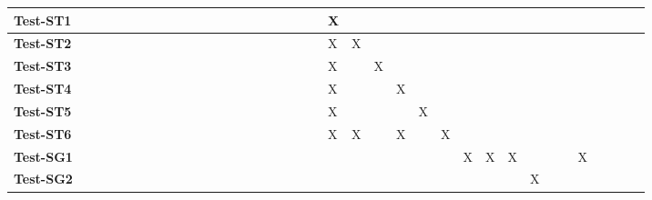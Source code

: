 \documentclass[12pt, titlepage]{article}
\begin{document}
\begin{landscape}
\begin{table}[H]
\begin{adjustwidth}{-0.1in}{-1in}
{\begin{tabular}{|c|c|c|c|c|c|c|c|c|c|c|c|c|c|c|c|c|l|l|l|l|l|l|l|l|l|l|l|l|l|l|l|l|l|l|l|l|}
\multicolumn{1}{|l|}{\textbf{Test-ST1}}   &             &             &             &              &              &              &              &             &              &              &              &              &              &              &              &                & & & & X& & & & & & & & & & & & & & & &\\ \hline
\multicolumn{1}{|l|}{\textbf{Test-ST2}}   &              &              &              &              &              &              &              &             &             &             &              &              &              &              &              &                & & & & X& X& & & & & & & & & & & & & & &\\ \hline
\multicolumn{1}{|l|}{\textbf{Test-ST3}}   &             &              &             &              &              &              &             &             &              &              &              &              &              &              &              &                & & & & X& & X& & & & & & & & & & & & & &\\ \hline
\multicolumn{1}{|l|}{\textbf{Test-ST4}}   &             &              &             &              &              &              &              &             &              &              &              &              &              &              &              &                & & & & X& & & X& & & & & & & & & & & & &\\ \hline
\multicolumn{1}{|l|}{\textbf{Test-ST5}}   &             &             &             &             &             &             &             &             &              &              &             &             &              &             &              &                & & & & X& & & & X& & & & & & & & & & & &\\ \hline
\multicolumn{1}{|l|}{\textbf{Test-ST6}}   &              &              &             &              &             &             &             &             &              &              &             &             &              &              &              &                & & & & X& X& & X& & X& & & & & & & & & & &\\ \hline
\multicolumn{1}{|l|}{\textbf{Test-SG1}}   &             &             &             &              &              &             &             &             &              &              &              &              &              &              &              &                & & & & & & & & & & X& X& X& & & &X & & & &\\ \hline
\multicolumn{1}{|l|}{\textbf{Test-SG2}}   &             &             &             &              &             &             &             &             &              &              &              &              &              &              &              &                & & & & & & & & & & & & & X& & & & & & &\\ \hline

\end{tabular}}
\end{adjustwidth}
\end{table}
\end{landscape}
\end{document}

